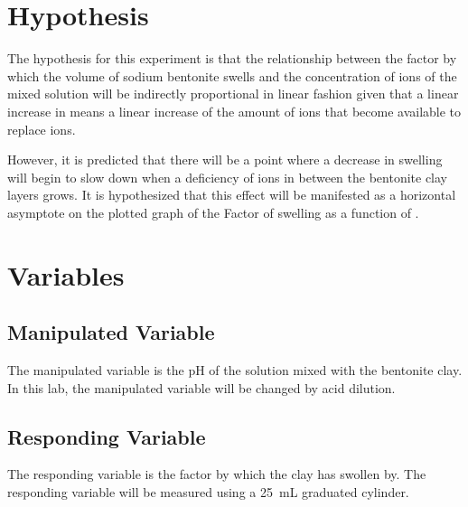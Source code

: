 \documentclass[11pt, letterpaper]{article}
\begin{document}
\section{Hypothesis}

The hypothesis for this experiment is that the relationship between
the factor by which the volume of
sodium bentonite swells and the concentration of  ions of the mixed
solution will be indirectly proportional in linear fashion
given that a linear increase in \ce{[H+]} means a linear increase
of the amount of  ions that become available to replace  ions.

However, it is predicted that there will be a point where
a decrease in swelling will begin to slow down when a deficiency
of  ions in between the bentonite clay layers grows.
It is hypothesized that this effect will be manifested
as a horizontal asymptote on the plotted graph of the Factor
of swelling as a function of \ce{[H+]}.

\section{Variables}

\begin{paracol}{2}
    \subsection{Manipulated Variable}
    The manipulated variable is the pH of the solution mixed with the
    bentonite clay. In this lab, the manipulated variable will be
    changed by acid dilution.
    \switchcolumn
    \subsection{Responding Variable}
    The responding variable is the factor by which the clay has swollen by.
    The responding variable will be measured using a \SI{25}{mL} graduated cylinder.

\end{paracol}
\end{document}
